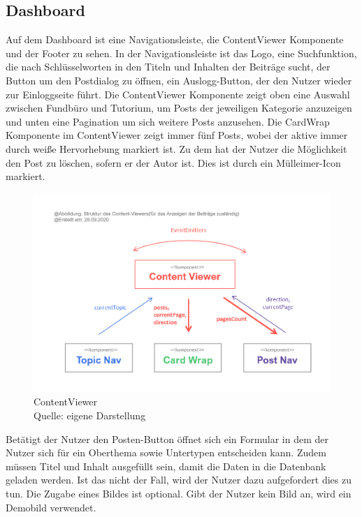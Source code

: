 \documentclass[12pt,titlepage]{article}
\begin{document}
\FloatBarrier

\subsection{Dashboard}

Auf dem Dashboard ist eine Navigationsleiste, die ContentViewer Komponente und der Footer zu sehen. In der Navigationsleiste ist das Logo, eine Suchfunktion, die nach Schlüsselworten in den Titeln und Inhalten der Beiträge sucht, der Button um den Postdialog zu öffnen, ein Auslogg-Button, der den Nutzer wieder zur Einloggseite führt. Die ContentViewer Komponente zeigt oben eine Auswahl zwischen Fundbüro und Tutorium, um Posts der jeweiligen Kategorie anzuzeigen und unten eine Pagination um sich weitere Posts anzusehen. Die CardWrap Komponente im ContentViewer zeigt immer fünf Posts, wobei der aktive immer durch weiße Hervorhebung markiert ist. Zu dem hat der Nutzer die Möglichkeit den Post zu löschen, sofern er der Autor ist. Dies ist durch ein Mülleimer-Icon markiert.

\begin{figure}[hbt!]
\centering
\includegraphics[]{abbildungen/Abbildung_ContentViewer.png}
\caption[ContentViewer]{ContentViewer \\Quelle: eigene Darstellung}
\end{figure}

Betätigt der Nutzer den Posten-Button öffnet sich ein Formular in dem der Nutzer sich für ein Oberthema sowie Untertypen entscheiden kann. Zudem müssen Titel und Inhalt ausgefüllt sein, damit die Daten in die Datenbank geladen werden. Ist das nicht der Fall, wird der Nutzer dazu aufgefordert dies zu tun. Die Zugabe eines Bildes ist optional. Gibt der Nutzer kein Bild an, wird ein Demobild verwendet.
\end{document}
